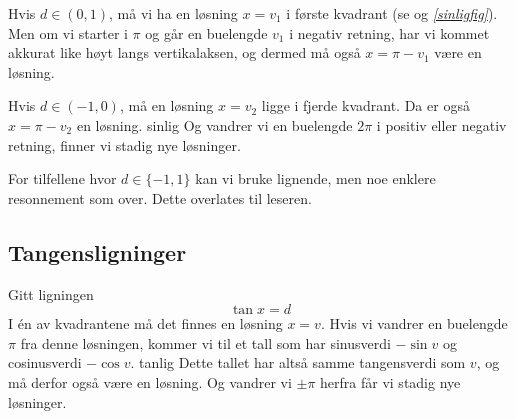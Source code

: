 Hvis $ {d\in(0, 1)}$, må vi ha en løsning $ {x=v_1} $ i første kvadrant (se  og \textit{\ref{sinligfig}}). Men om vi starter i $ \pi $ og går en buelengde $ v_1 $ i negativ retning, har vi kommet akkurat like høyt langs vertikalaksen, og dermed må også ${x=\pi-v_1} $ være en løsning.\vsk

Hvis $ {d\in(-1, 0)}$, må en løsning $ x=v_2 $ ligge i fjerde kvadrant. Da er også $ x=\pi-v_2 $ en løsning.
{sinlig}
Og vandrer vi en buelengde $ 2\pi $ i positiv eller negativ retning, finner vi stadig nye løsninger. \vsk

For tilfellene hvor $d\in\{-1, 1\}$ kan vi bruke lignende, men noe enklere resonnement som over. Dette overlates til leseren.
\regv

\newpage
{}
\newpage
\subsection{Tangensligninger}
Gitt ligningen
\[ \tan x = d \]
I én av kvadrantene må det finnes en løsning ${ x=v }$. Hvis vi vandrer en buelengde $ \pi $ fra denne løsningen, kommer vi til et tall som har sinusverdi $ {-\sin v} $ og cosinusverdi $ {-\cos v} $.
{tanlig}
Dette tallet har altså samme tangensverdi som $ v $, og må derfor også være en løsning. Og vandrer vi $ \pm \pi $ herfra får vi stadig nye løsninger. \regv

\newpage
{}
